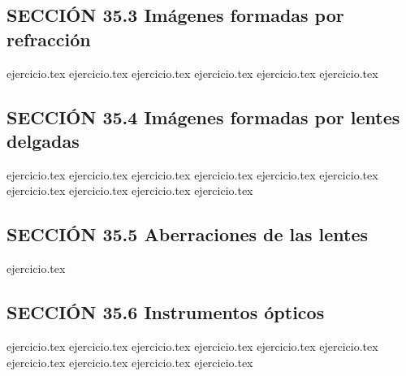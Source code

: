 \subsection*{SECCIÓN 35.3 Imágenes formadas por refracción}
\begin{enumerate}
    \setcounter{enumi}{16}
    {ejercicio.tex}
    {ejercicio.tex}
    {ejercicio.tex}
    {ejercicio.tex}
    {ejercicio.tex}
    {ejercicio.tex}
\end{enumerate}

\subsection*{SECCIÓN 35.4 Imágenes formadas por lentes delgadas}
\begin{enumerate}
    \setcounter{enumi}{22}
    {ejercicio.tex}
    {ejercicio.tex}
    {ejercicio.tex}
    {ejercicio.tex}
    {ejercicio.tex}
    {ejercicio.tex}
    {ejercicio.tex}
    {ejercicio.tex}
    {ejercicio.tex}
    {ejercicio.tex}
\end{enumerate}

\subsection*{SECCIÓN 35.5 Aberraciones de las lentes}
\begin{enumerate}
    \setcounter{enumi}{32}
    {ejercicio.tex}
\end{enumerate}

\subsection*{SECCIÓN 35.6 Instrumentos ópticos}
\begin{enumerate}
    \setcounter{enumi}{33}
    {ejercicio.tex}
    {ejercicio.tex}
    {ejercicio.tex}
    {ejercicio.tex}
    {ejercicio.tex}
    {ejercicio.tex}
    {ejercicio.tex}
    {ejercicio.tex}
    {ejercicio.tex}
    {ejercicio.tex}
\end{enumerate}

